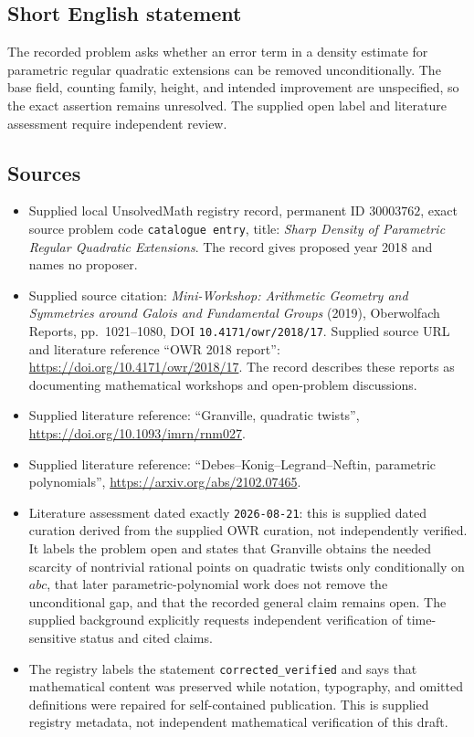 \documentclass[11pt]{article}
\begin{document}
\subsection{Short English statement}
The recorded problem asks whether an error term in a density estimate for parametric regular quadratic extensions can be removed unconditionally. The base field, counting family, height, and intended improvement are unspecified, so the exact assertion remains unresolved. The supplied open label and literature assessment require independent review.
\subsection{Sources}
\begin{itemize}
\item Supplied local UnsolvedMath registry record, permanent ID \(30003762\), exact source problem code \texttt{catalogue entry}, title: \emph{Sharp Density of Parametric Regular Quadratic Extensions}. The record gives proposed year 2018 and names no proposer.
\item Supplied source citation: \emph{Mini-Workshop: Arithmetic Geometry and Symmetries around Galois and Fundamental Groups} (2019), Oberwolfach Reports, pp.\ 1021--1080, DOI \texttt{10.4171/owr/2018/17}. Supplied source URL and literature reference ``OWR 2018 report'': \url{https://doi.org/10.4171/owr/2018/17}. The record describes these reports as documenting mathematical workshops and open-problem discussions.
\item Supplied literature reference: ``Granville, quadratic twists'', \url{https://doi.org/10.1093/imrn/rnm027}.
\item Supplied literature reference: ``Debes--Konig--Legrand--Neftin, parametric polynomials'', \url{https://arxiv.org/abs/2102.07465}.
\item Literature assessment dated exactly \texttt{2026-08-21}: this is supplied dated curation derived from the supplied OWR curation, not independently verified. It labels the problem open and states that Granville obtains the needed scarcity of nontrivial rational points on quadratic twists only conditionally on \(abc\), that later parametric-polynomial work does not remove the unconditional gap, and that the recorded general claim remains open. The supplied background explicitly requests independent verification of time-sensitive status and cited claims.
\item The registry labels the statement \texttt{corrected\_verified} and says that mathematical content was preserved while notation, typography, and omitted definitions were repaired for self-contained publication. This is supplied registry metadata, not independent mathematical verification of this draft.
\end{itemize}
\end{document}
